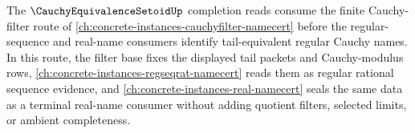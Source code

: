 The $\CauchyEquivalenceSetoidUp$ completion reads consume the finite Cauchy-filter route of \autoref{ch:concrete-instances-cauchyfilter-namecert} before the regular-sequence and real-name consumers identify tail-equivalent regular Cauchy names. In this route, the filter base fixes the displayed tail packets and Cauchy-modulus rows, \autoref{ch:concrete-instances-regseqrat-namecert} reads them as regular rational sequence evidence, and \autoref{ch:concrete-instances-real-namecert} seals the same data as a terminal real-name consumer without adding quotient filters, selected limits, or ambient completeness.
